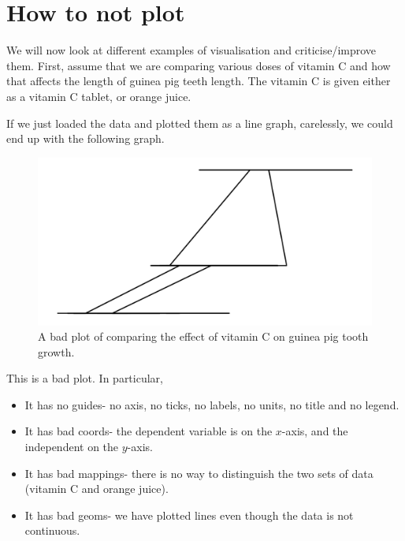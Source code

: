 \documentclass[a4paper, openany]{memoir}
\begin{document}
\section{How to not plot}
We will now look at different examples of visualisation and criticise/improve them. First, assume that we are comparing various doses of vitamin C and how that affects the length of guinea pig teeth length. The vitamin C is given either as a vitamin C tablet, or orange juice.

If we just loaded the data and plotted them as a line graph, carelessly, we could end up with the following graph.
\begin{figure}[H]
    \centering
    \includegraphics[scale=0.4]{src/2.11 VitC Example Plot 1.png}
    \caption{A bad plot of comparing the effect of vitamin C on guinea pig tooth growth.}
\end{figure}
This is a bad plot. In particular,
\begin{itemize}
    \item It has no guides- no axis, no ticks, no labels, no units, no title and no legend.
    \item It has bad coords- the dependent variable is on the $x$-axis, and the independent on the $y$-axis.
    \item It has bad mappings- there is no way to distinguish the two sets of data (vitamin C and orange juice).
    \item It has bad geoms- we have plotted lines even though the data is not continuous.
\end{itemize}
\end{document}
